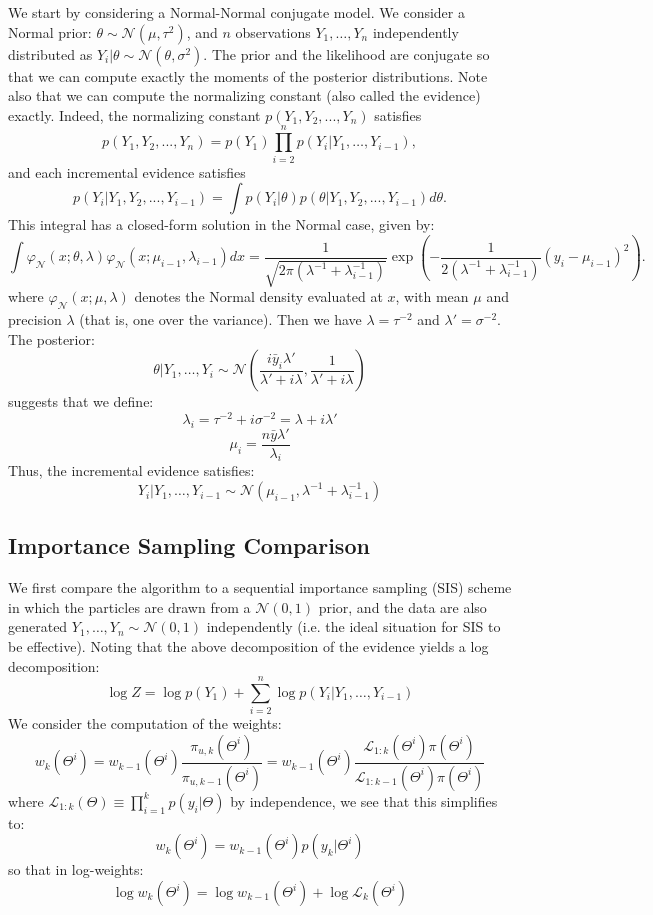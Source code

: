 \documentclass[psamsfonts]{amsart}
\begin{document}
We start by considering a Normal-Normal conjugate model. We consider a Normal prior: $\theta\sim\mathcal{N}(\mu,\tau^2)$, and $n$ observations $Y_1,\ldots,Y_n$ independently distributed as $Y_i|\theta\sim\mathcal{N}(\theta,\sigma^2)$.
The prior and the likelihood are conjugate so that we can compute exactly the moments of the posterior distributions.
Note also that we can compute the normalizing constant (also called the evidence) exactly. Indeed, the normalizing constant
$p(Y_{1}, Y_{2}, ... , Y_{n})$ satisfies
 \[
p(Y_{1}, Y_{2}, ... , Y_{n}) = p(Y_1) \prod_{i=2}^n p(Y_i| Y_1, \ldots, Y_{i-1}),
 \]
and each incremental evidence satisfies
 \[
 p(Y_i | Y_{1}, Y_{2}, ... , Y_{i-1}) = \int p(Y_i | \theta) p(\theta | Y_{1}, Y_{2}, ... , Y_{i-1}) d\theta.
 \]
 This integral has a closed-form solution in the Normal case, given by:
 \[
 \int\varphi_{\mathcal{N}}(x;\theta,\lambda)\varphi_{\mathcal{N}}(x;\mu_{i-1},\lambda_{i-1}) dx=\frac{1}{\sqrt{2\pi\left(\lambda^{-1}+\lambda_{i-1}^{-1}\right)}}\exp\left(-\frac{1}{2\left(\lambda^{-1}+\lambda_{i-1}^{-1}\right)}\left(y_i-\mu_{i-1}\right)^{2}\right).
 \]
 where $\varphi_{\mathcal{N}}(x;\mu,\lambda)$ denotes the Normal density evaluated at $x$, with mean $\mu$ and precision $\lambda$ (that is, one over the variance). Then we have $\lambda = \tau^{-2}$ and $\lambda' = \sigma^{-2}$. The posterior:
 $$\theta|Y_1, \dots, Y_i \sim \mathcal{N}\left( \frac{i\bar{y}_i\lambda'}{\lambda' + i\lambda}, \frac{1}{\lambda' + i\lambda} \right) $$
 suggests that we define:
 $$\lambda_i = \tau^{-2} + i\sigma^{-2} = \lambda + i\lambda'$$
 $$\mu_i = \frac{n \bar{y} \lambda'}{\lambda_i}$$
 Thus, the incremental evidence satisfies:
 $$Y_i|Y_1,\dots,Y_{i-1} \sim \mathcal{N}(\mu_{i-1}, \lambda^{-1} + \lambda_{i-1}^{-1})$$  
 
 \subsection{Importance Sampling Comparison}
 
 We first compare the algorithm to a sequential importance sampling (SIS) scheme in which the particles are drawn from a $\mathcal{N}(0,1)$ prior, and the data are also generated $Y_1, \dots, Y_n \sim \mathcal{N}(0,1)$ independently (i.e. the ideal situation for SIS to be effective). Noting that the above decomposition of the evidence yields a log decomposition:
 $$\log Z = \log p(Y_1) + \sum_{i=2}^n \log p(Y_i|Y_1, \dots, Y_{i-1})$$
We consider the computation of the weights:
$$w_k(\Theta^i) = w_{k-1}(\Theta^i)\frac{\pi_{u,k}(\Theta^i)}{\pi_{u,k-1}(\Theta^i)} = w_{k-1}(\Theta^i) \frac{\mathcal{L}_{1:k}(\Theta^i)\pi(\Theta^i)}{\mathcal{L}_{1:k-1}(\Theta^i)\pi(\Theta^i)}$$
where $\mathcal{L}_{1:k}(\Theta) \equiv \prod_{i=1}^k p(y_i|\Theta)$ by independence, we see that this simplifies to:
$$w_k(\Theta^i) = w_{k-1}(\Theta^i)p(y_k|\Theta^i)$$
so that in log-weights:
$$\log w_k(\Theta^i) = \log w_{k-1}(\Theta^i) + \log \mathcal{L}_k (\Theta^i)$$
\end{document}
